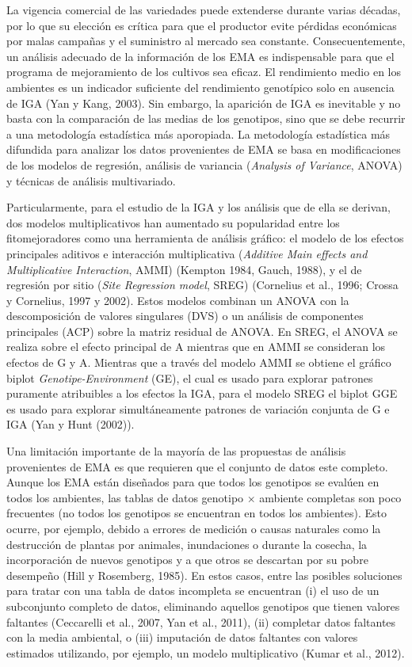 La vigencia comercial de las variedades puede extenderse durante varias décadas, por lo que su elección es crítica para que el productor evite pérdidas económicas por malas campañas y el suministro al mercado sea constante. Consecuentemente, un análisis adecuado de la información de los EMA es indispensable para que el programa de mejoramiento de los cultivos sea eficaz. El rendimiento medio en los ambientes es un indicador suficiente del rendimiento genotípico solo en ausencia de IGA (Yan y Kang, 2003). Sin embargo, la aparición de IGA es inevitable y no basta con la comparación de las medias de los genotipos, sino que se debe recurrir a una metodología estadística más aporopiada. La metodología estadística más difundida para analizar los datos provenientes de EMA se basa en modificaciones de los modelos de regresión, análisis de variancia (\emph{Analysis of Variance}, ANOVA) y técnicas de análisis multivariado. 

Particularmente, para el estudio de la IGA y los análisis que de ella se derivan, dos modelos multiplicativos han aumentado su popularidad entre los fitomejoradores como una herramienta de análisis gráfico: el modelo de los efectos principales aditivos e interacción multiplicativa (\emph{Additive Main effects and Multiplicative Interaction}, AMMI) (Kempton 1984, Gauch, 1988), y el de regresión por sitio (\emph{Site Regression model}, SREG) (Cornelius et al., 1996; Crossa y Cornelius, 1997 y 2002).  Estos modelos combinan un ANOVA con la descomposición de valores singulares (DVS) o un análisis de componentes principales (ACP) sobre la matriz residual de ANOVA. En SREG, el ANOVA se realiza sobre el efecto principal de A mientras que en AMMI se consideran los  efectos de G y A. Mientras que a través del modelo AMMI se obtiene el gráfico biplot \emph{Genotipe-Environment} (GE), el cual es usado para explorar patrones puramente atribuibles a los efectos la IGA, para el modelo SREG el biplot GGE es usado para explorar simultáneamente patrones de variación conjunta de G e IGA (Yan y Hunt (2002)).

Una limitación importante de la mayoría de las propuestas de análisis provenientes de EMA es que requieren que el conjunto de datos este completo. Aunque los EMA están diseñados para que todos los genotipos se evalúen en todos los ambientes,  las tablas de datos genotipo $\times$ ambiente completas son poco frecuentes (no todos los genotipos se encuentran en todos los ambientes). Esto ocurre, por ejemplo, debido a errores de medición o causas naturales como la destrucción de plantas por animales, inundaciones o durante la cosecha, la incorporación de nuevos genotipos y a que otros se descartan por su pobre desempeño (Hill y Rosemberg, 1985). En estos casos, entre las posibles soluciones para tratar con una tabla de datos incompleta se encuentran (i) el uso de un subconjunto completo de datos, eliminando aquellos genotipos que tienen valores faltantes (Ceccarelli et al., 2007, Yan et al., 2011), (ii) completar datos faltantes con la media ambiental, o (iii) imputación de datos faltantes con valores estimados utilizando, por ejemplo, un modelo multiplicativo (Kumar et al., 2012). 



